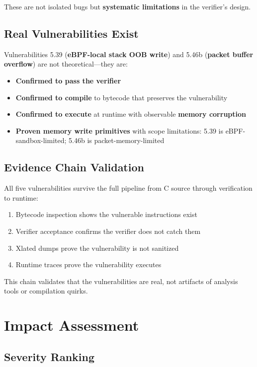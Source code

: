 These are not isolated bugs but \textbf{systematic limitations} in the verifier's design.

\subsection{Real Vulnerabilities Exist}

Vulnerabilities 5.39 (\textbf{eBPF-local stack OOB write}) and 5.46b (\textbf{packet buffer overflow}) are not theoretical—they are:
\begin{itemize}
  \item \textbf{Confirmed to pass the verifier}
  \item \textbf{Confirmed to compile} to bytecode that preserves the vulnerability
  \item \textbf{Confirmed to execute} at runtime with observable \textbf{memory corruption}
  \item \textbf{Proven memory write primitives} with scope limitations: 5.39 is eBPF-sandbox-limited; 5.46b is packet-memory-limited
\end{itemize}

\subsection{Evidence Chain Validation}

All five vulnerabilities survive the full pipeline from C source through verification to runtime:
\begin{enumerate}[label=\arabic*.]
  \item Bytecode inspection shows the vulnerable instructions exist
  \item Verifier acceptance confirms the verifier does not catch them
  \item Xlated dumps prove the vulnerability is not sanitized
  \item Runtime traces prove the vulnerability executes
\end{enumerate}

This chain validates that the vulnerabilities are real, not artifacts of analysis tools or compilation quirks.

\section{Impact Assessment}

\subsection{Severity Ranking}

